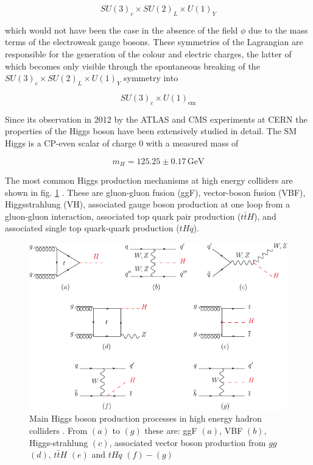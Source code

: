 \begin{equation*}
	SU(3)_c \times SU(2)_L \times U(1)_Y
\end{equation*}

which would not have been the case in the absence of the field $\phi$ due to the mass terms of the electroweak gauge bosons. These symmetries of the Lagrangian are responsible for the generation of the colour and electric charges, the latter of which becomes only visible through the spontaneous breaking of the $SU(3)_c \times SU(2)_L \times U(1)_Y$ symmetry into

\begin{equation*}
	SU(3)_c \times U(1)_\text{em}
\end{equation*}

Since its observation in 2012 by the ATLAS and CMS experiments at CERN \cite{Chatrchyan_2012} the properties of the Higgs boson have been extensively studied in detail. The SM Higgs is a CP-even scalar of charge 0 with a measured mass of

\begin{equation*}
	m_H = 125.25 \pm 0.17 \, \text{GeV}
\end{equation*}

The most common Higgs production mechanisms at high energy colliders are shown in fig. \ref{fig:higgsproduction} \cite{Workman:2022ynf}. These are gluon-gluon fusion (ggF), vector-boson fusion (VBF), Higgsstrahlung (VH), associated gauge boson production at one loop from a gluon-gluon interaction, associated top quark pair production ($t\bar{t}H$), and associated single top quark-quark production ($tHq$).

\begin{figure}[h!]
	\centering
	\includegraphics[width=0.8\linewidth]{figures/theory/higgsproduction.pdf}
	\caption{Main Higgs boson production processes in high energy hadron colliders \cite{Workman:2022ynf}. From $(a)$ to $(g)$ these are: ggF $(a)$, VBF $(b)$, Higgs-strahlung $(c)$, associated vector boson production from $gg$ $(d)$, $t\bar{t}H$ $(e)$ and $tHq$ $(f)-(g)$}
	\label{fig:higgsproduction}
\end{figure}

